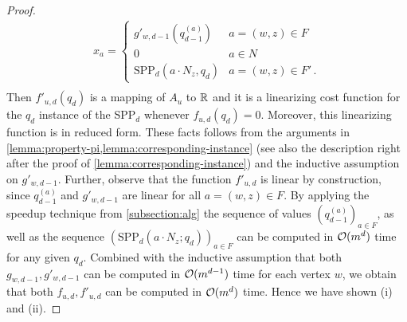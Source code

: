 \begin{proof}
    \begin{align*}
        x_a = \begin{cases}
            g'_{w,d-1}(q^{(a)}_{d-1}) & a = (w,z) \in F\\
            0 & a \in N\\
            \text{SPP}_d(a \cdot N_z, q_d) & a = (w,z) \in F'\, .
        \end{cases} \\
    \end{align*}
    Then $f'_{u,d}(q_d)$ is a mapping of $A_u$ to $\mathbb{R}$ and it is a linearizing cost function for the $q_d$ instance of the SPP$_d$ whenever $f_{u,d}(q_d) = 0$. Moreover,  this linearizing function is in reduced form. These facts  follows from the arguments in \cref{lemma:property-pi,lemma:corresponding-instance} (see also the description  right after the proof of  \cref{lemma:corresponding-instance})  and the inductive assumption on $g'_{w,d-1}$. 
    Further, observe that  the function $f'_{u,d}$ is linear by construction,  since $q_{d-1}^{(a)}$ and $g'_{w,d-1}$ are linear for all $a=(w,z)\in F$.
    By applying  the speedup technique from \cref{subsection:alg}  the sequence of values $(q^{(a)}_{d-1})_{a \in F}$, as well as the sequence $(\text{SPP}_d(a \cdot N_z; q_d))_{a\in F}$ can be computed in $\mathcal{O}(m^d)$ time for any  given $q_d$. 
    Combined with the inductive assumption that both $g_{w,d-1}, g'_{w,d-1}$ can be computed in $\mathcal{O}(m^{d-1})$ time for each vertex $w$, we obtain that both $f_{u,d}, f'_{u,d}$ can be computed in $\mathcal{O}(m^d)$ time. Hence we have shown (i) and (ii).
\smallskip


\end{proof}
